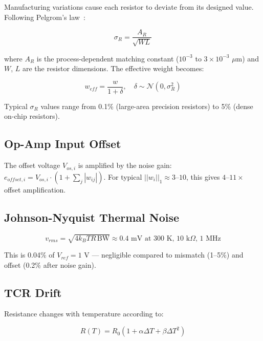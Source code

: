 \documentclass[10pt,twocolumn]{article}
\begin{document}
Manufacturing variations cause each resistor to deviate from its designed value. Following Pelgrom's law~\cite{pelgrom1989}:

\begin{equation}
\sigma_R = \frac{A_R}{\sqrt{WL}}
\end{equation}

where $A_R$ is the process-dependent matching constant ($10^{-3}$ to $3 \times 10^{-3}$ $\mu$m) and $W$, $L$ are the resistor dimensions. The effective weight becomes:

\begin{equation}
w_{eff} = \frac{w}{1 + \delta}, \quad \delta \sim \mathcal{N}(0, \sigma_R^2)
\end{equation}

Typical $\sigma_R$ values range from 0.1\% (large-area precision resistors) to 5\% (dense on-chip resistors).

\subsection{Op-Amp Input Offset}

The offset voltage $V_{os,i}$ is amplified by the noise gain: $e_{offset,i} = V_{os,i} \cdot (1 + \sum_j |w_{ij}|)$. For typical $||w_i||_1 \approx 3$--$10$, this gives $4$--$11\times$ offset amplification.

\subsection{Johnson-Nyquist Thermal Noise}

\begin{equation}
v_{rms} = \sqrt{4 k_B T R \, \text{BW}} \approx 0.4 \text{ mV at 300 K, 10 k}\Omega\text{, 1 MHz}
\end{equation}

This is 0.04\% of $V_{ref} = 1$ V --- negligible compared to mismatch (1--5\%) and offset (0.2\% after noise gain).

\subsection{TCR Drift}

Resistance changes with temperature according to:

\begin{equation}
R(T) = R_0 \left(1 + \alpha \Delta T + \beta \Delta T^2\right)
\end{equation}
\end{document}
